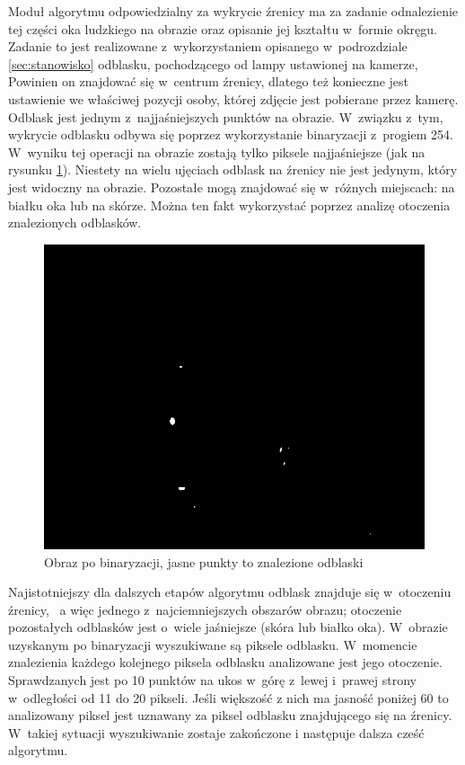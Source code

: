 Moduł algorytmu odpowiedzialny za wykrycie źrenicy ma za zadanie odnalezienie tej części oka ludzkiego na obrazie oraz opisanie jej kształtu w~formie okręgu. Zadanie to jest realizowane z~wykorzystaniem opisanego w~podrozdziale \ref{sec:stanowisko} odblasku, pochodzącego od lampy ustawionej na kamerze, Powinien on znajdować się w~centrum źrenicy, dlatego też konieczne jest ustawienie we właściwej pozycji osoby, której zdjęcie jest pobierane przez kamerę. Odblask jest jednym z~najjaśniejszych punktów na obrazie. W~związku z~tym, wykrycie odblasku odbywa się poprzez wykorzystanie binaryzacji z~progiem 254. W~wyniku tej operacji na obrazie zostają tylko piksele najjaśniejsze (jak na rysunku \ref{fig:binaryzacja}). Niestety na wielu ujęciach odblask na źrenicy nie jest jedynym, który jest widoczny na obrazie. Pozostałe mogą znajdować się w~różnych miejscach: na białku oka lub na skórze. Można ten fakt wykorzystać poprzez analizę otoczenia znalezionych odblasków. 

\begin{figure}
\begin{center}
\includegraphics[scale=0.5]{binaryzacja.jpg}
\caption{Obraz po binaryzacji, jasne punkty to znalezione odblaski}
\label{fig:binaryzacja}
\end{center}
\end{figure}

Najistotniejszy dla dalszych etapów algorytmu odblask znajduje się w~otoczeniu źrenicy, ~a więc jednego z~najciemniejszych obszarów obrazu; otoczenie pozostałych odblasków jest o~wiele jaśniejsze (skóra lub białko oka). W~obrazie uzyskanym po binaryzacji wyszukiwane są piksele odblasku. W~momencie znalezienia każdego kolejnego piksela odblasku analizowane jest jego otoczenie. Sprawdzanych jest po 10 punktów na ukos w~górę z~lewej i~prawej strony w~odległości od 11 do 20 pikseli. Jeśli większość z nich ma jasność poniżej 60 to analizowany piksel jest uznawany za piksel odblasku znajdującego się na źrenicy. W~takiej sytuacji wyszukiwanie zostaje zakończone i następuje dalsza cześć algorytmu.

